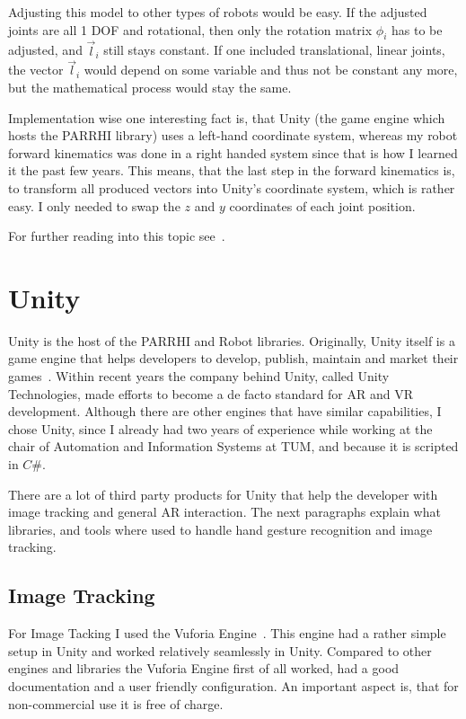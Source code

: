 Adjusting this model to other types of robots would be easy. If the adjusted joints are all 1 DOF and rotational, then only the rotation matrix $\phi_i$ has to be adjusted, and $\vec{l}_i$ still stays constant. If one included translational, linear joints, the vector $\vec{l}_i$ would depend on some variable and thus not be constant any more, but the mathematical process would stay the same.

Implementation wise one interesting fact is, that Unity (the game engine which hosts the PARRHI library) uses a left-hand coordinate system, whereas my robot forward kinematics was done in a right handed system since that is how I learned it the past few years. This means, that the last step in the forward kinematics is, to transform all produced vectors into Unity's coordinate system, which is rather easy. I only needed to swap the $z$ and $y$ coordinates of each joint position.

For further reading into this topic see~\cite{murray2017mathematical}.
	
\section{Unity}
Unity is the host of the PARRHI and Robot libraries. Originally, Unity itself is a game engine that helps developers to develop, publish, maintain and market their games~\cite{Unity}. Within recent years the company behind Unity, called Unity Technologies, made efforts to become a de facto standard for AR and VR development. Although there are other engines that have similar capabilities, I chose Unity, since I already had two years of experience while working at the chair of Automation and Information Systems at TUM, and because it is scripted in $C\#$. 

There are a lot of third party products for Unity that help the developer with image tracking and general AR interaction. The next paragraphs explain what libraries, and tools where used to handle hand gesture recognition and image tracking.



\subsection{Image Tracking}
For Image Tacking I used the Vuforia Engine~\cite{Vuforia}. This engine had a rather simple setup in Unity and worked relatively seamlessly in Unity. Compared to other engines and libraries the Vuforia Engine first of all worked, had a good documentation and a user friendly configuration. An important aspect is, that for non-commercial use it is free of charge. 

